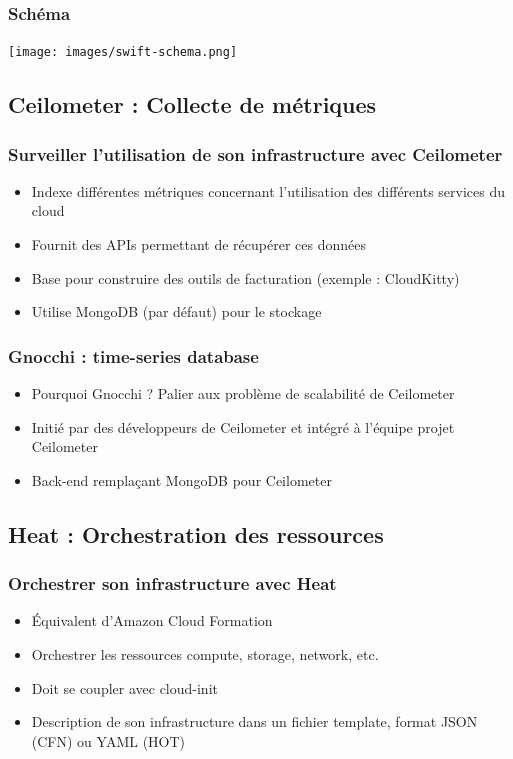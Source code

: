   \begin{frame}
    \frametitle{Schéma}
    \texttt{[image: images/swift-schema.png]}
  \end{frame}

  \subsection[Ceilometer]{Ceilometer : Collecte de métriques}

  \begin{frame}
    \frametitle{Surveiller l'utilisation de son infrastructure avec Ceilometer}
    \begin{itemize}
      \item Indexe différentes métriques concernant l'utilisation des différents services du cloud
      \item Fournit des APIs permettant de récupérer ces données
      \item Base pour construire des outils de facturation (exemple : CloudKitty)
      \item Utilise MongoDB (par défaut) pour le stockage
    \end{itemize}
  \end{frame}

  \begin{frame}
    \frametitle{Gnocchi : time-series database}
    \begin{itemize}
      \item Pourquoi Gnocchi ? Palier aux problème de scalabilité de Ceilometer
      \item Initié par des développeurs de Ceilometer et intégré à l'équipe projet Ceilometer
      \item Back-end remplaçant MongoDB pour Ceilometer
    \end{itemize}
  \end{frame}

  \subsection[Heat]{Heat : Orchestration des ressources}

  \begin{frame}
    \frametitle{Orchestrer son infrastructure avec Heat}
    \begin{itemize}
      \item Équivalent d'Amazon Cloud Formation
      \item Orchestrer les ressources compute, storage, network, etc.
      \item Doit se coupler avec cloud-init\pause
      \item Description de son infrastructure dans un fichier template, format JSON (CFN) ou YAML (HOT)
    \end{itemize}
  \end{frame}

